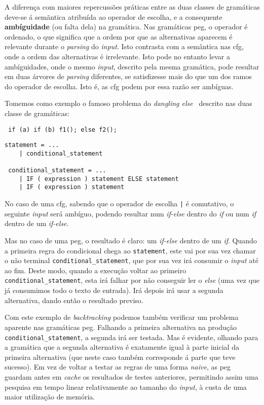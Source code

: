 A diferença com maiores repercussões práticas entre as duas classes de gramáticas deve-se á semãntica atribuída ao operador de escolha, e a consequente \textbf{ambíguidade} (ou falta dela) na gramática. Nas gramáticas \acrshort{peg}, o operador é ordenado, o que significa que a ordem por que as alternativas aparecem é relevante durante o \textit{parsing} do \textit{input}. Isto contrasta com a semântica nas \acrshort{cfg}, onde a ordem das alternativas é irrelevante. Isto pode no entanto levar a ambíguidades, onde o mesmo \textit{input}, descrito pela mesma gramática, pode resultar em duas árvores de \textit{parsing} diferentes, se satisfizesse mais do que um dos ramos do operador de escolha. Isto é, as \acrshort{cfg} podem por essa razão ser ambíguas.

Tomemos como exemplo o famoso problema do \textit{dangling else}~\cite{dangling-else} descrito nas duas classe de gramáticas:
\begin{lstlisting}
 if (a) if (b) f1(); else f2();
\end{lstlisting}

\begin{lstlisting}[caption=Gramática,captionpos=t]
 statement = ...
    | conditional_statement
 
 conditional_statement = ...
    | IF ( expression ) statement ELSE statement
    | IF ( expression ) statement
\end{lstlisting}

No caso de uma \acrshort{cfg}, sabendo que o operador de escolha \texttt{|} é comutativo, o seguinte \textit{input} será ambíguo, podendo resultar num \textit{if-else} dentro do \textit{if} ou num \textit{if} dentro de um \textit{if-else}.

Mas no caso de uma \acrshort{peg}, o resultado é claro: um \textit{if-else} dentro de um \textit{if}. Quando a primeira regra do condicional chega ao \texttt{statement}, este vai por sua vez chamar o não terminal \texttt{conditional\_statement}, que por sua vez irá consumir o \textit{input} até ao fim. Deste modo, quando a execução voltar ao primeiro \texttt{conditional\_statement}, esta irá falhar por não conseguir ler o \textit{else} (uma vez que já consumimos todo o texto de entrada). Irá depois irá usar a segunda alternativa, dando então o resultado previso.

Com este exemplo de \textit{backtracking} podemos também verificar um problema aparente nas gramáticas \acrshort{peg}. Falhando a primeira alternativa na produção \texttt{conditional\_statement}, a segunda irá ser testada. Mas é evidente, olhando para a gramática que a segunda alternativa é exatamente igual à parte inicial da primeira alternativa (que neste caso também corresponde á parte que teve sucesso). Em vez de voltar a testar as regras de uma forma \textit{naive}, as \acrlong{peg} guardam antes em \textit{cache} os resultados de testes anteriores, permitindo assim uma pesquisa em tempo linear relativamente ao tamanho do \textit{input}, à custa de uma maior utilização de memória.

